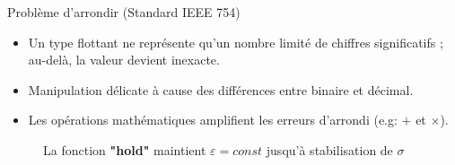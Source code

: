 \documentclass[10pt]{beamer}
\begin{document}
\begin{frame}{Problème d'arrondir (Standard IEEE 754)}
    \begin{itemize}
        \item Un type flottant ne représente qu’un nombre limité de chiffres significatifs ; au-delà, la valeur devient inexacte.
        \item Manipulation délicate à cause des différences entre binaire et décimal.
        \item Les opérations mathématiques amplifient les erreurs d’arrondi (e.g: $+$ et $\times$).
    \end{itemize}
    \begin{figure}[h]
        \centering
        \caption{La fonction \textbf{"hold"} maintient $\varepsilon = const$ jusqu’à stabilisation de $\sigma$}
    \end{figure}
\end{frame}
\end{document}
